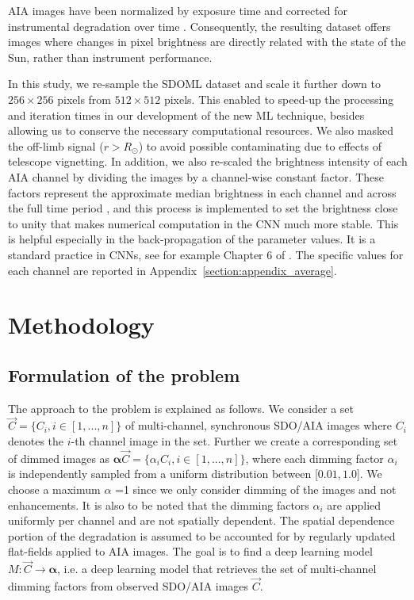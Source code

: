 \documentclass[twocolumn,usenames,dvipsnames]{aastex63}
\begin{document}
AIA images have been normalized by exposure time and corrected for instrumental degradation over time \citep[using V8 degradation curve from sounding rocket experiments,][]{Boerner2013}. Consequently, the resulting dataset offers images where changes in pixel brightness are directly related with the state of the Sun, rather than instrument performance.

In this study, we re-sample the SDOML dataset and scale it further down to $256\times256$ pixels from $512\times512$ pixels. This enabled to  speed-up the processing and iteration times in our development of the new ML technique, besides allowing us to conserve the necessary computational resources. We also masked the off-limb signal ($r>R_\odot$) to avoid possible contaminating due to effects of telescope vignetting. In addition, we also re-scaled the brightness intensity of each AIA channel by dividing the images by a channel-wise constant factor. These factors represent the approximate median brightness in each channel and across the full time period \citep[derived from][]{SDOML}, and this process is implemented to set the brightness close to unity that makes numerical computation in the CNN much more stable. This is helpful especially in the back-propagation of the parameter values. It is a standard practice in CNNs, see for example Chapter 6 of \citep[][]{goodfellow2016deep}. The specific values for each channel are reported in Appendix~\ref{section:appendix_average}.

\section{Methodology}
\label{section:methodology}
\subsection{Formulation of the problem}
\label{section:formulation}
The approach to the problem is explained as follows. We consider a set $\vec{C} = \{C_i, i\in [1,...,n]\}$ of multi-channel, synchronous SDO/AIA images where $C_i$ denotes the $i$-th channel image in the set. Further we create a corresponding set of dimmed images as $\mathbf{\alpha} \vec{C} = \{\alpha_i C_i, i\in [1,...,n]\}$, where each dimming factor $\alpha_i$ is independently sampled from a uniform distribution between [$0.01, 1.0$]. We choose a maximum $\alpha$ =1 since we only consider dimming of the images and not enhancements. It is also to be noted that the dimming factors $\alpha_i$ are applied uniformly per channel and are not spatially dependent. The spatial dependence portion of the degradation is assumed to be accounted for by regularly updated flat-fields applied to AIA images. The goal is to find a deep learning model $M: \vec{C} \rightarrow \mathbf{\alpha}$, i.e. a deep learning model that retrieves the set of multi-channel dimming factors from observed SDO/AIA images $\vec{C}$.
\end{document}
